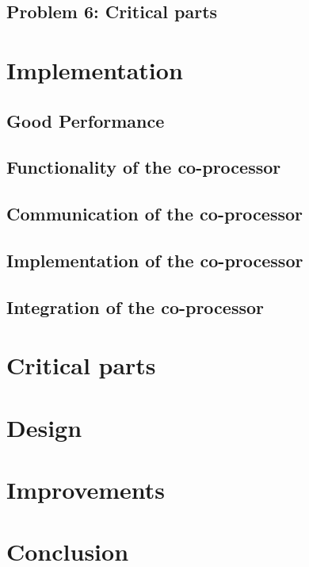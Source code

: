 \documentclass[12pt,a4paper]{article}
\begin{document}
\subsection{Problem 6: Critical parts}
		
\section{Implementation}
\subsection{Good Performance}

\subsection{Functionality of the co-processor}
	
\subsection{Communication of the co-processor}

\subsection{Implementation of the co-processor}

\subsection{Integration of the co-processor}
	
\section{Critical parts}


\section{Design}

	
\section{Improvements}

\section{Conclusion}
\end{document}
